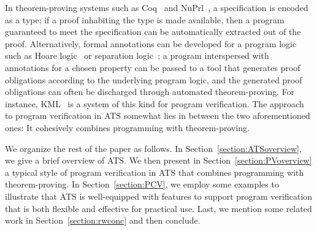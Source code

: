 \documentclass{llncs}
\begin{document}
In theorem-proving systems such as Coq~\cite{Coq} and
NuPrl~\cite{CONSTABLE86}, a specification is encoded as a type; if a proof
inhabiting the type is made available, then a program guaranteed to meet
the specification can be automatically extracted out of the
proof. Alternatively, formal annotations can be developed for a program
logic such as Hoare logic~\cite{HOARE69} or separation
logic~\cite{SeparationLogic}; a program interspersed with annotations for a
chosen property can be passed to a tool that generates proof obligations
according to the underlying program logic, and the generated proof
obligations can often be discharged through automated theorem-proving. For
instance, KML~\cite{Tushkanova2009Specifying} is a system of this kind for
program verification. The approach to program verification in ATS somewhat
lies in between the two aforementioned ones: It cohesively combines
programming with theorem-proving.

We organize the rest of the paper as follows.  In
Section~\ref{section:ATSoverview}, we give a brief overview of ATS.  We
then present in Section~\ref{section:PVoverview} a typical style of program
verification in ATS that combines programming with theorem-proving.  In
Section~\ref{section:PCV}, we employ some examples to illustrate that ATS
is well-equipped with features to support program verification that is both
flexible and effective for practical use.  Last, we mention some related
work in Section~\ref{section:rwconc} and then conclude.

\def\saddr{\it addr}
\def\sbool{\it bool}
\def\sint{\it int}
\def\schar{\it char}
\def\sfloat{\it float}
\def\snat{\it nat}
\def\sprop{\it prop}
\def\stype{\it type}
\def\sview{\it view}
\def\sviewtype{\it viewtype}

\def\sig{{\cal S}}

\def\emptysig{\sig_{\emptyset}}

\def\emptyssub{[]}
\def\ssub{\Theta_S}
\def\emptydsub{[]}
\def\dsub{\Theta_D}

\def\emptysctx{\emptyset}
\def\emptydctx{\emptyset}

\def\basesort{b}

\def\simp{\rightarrow}
\def\Simp{\Rightarrow}

\def\sconst{\mbox{\it sc}}
\def\dconst{\mbox{\it dc}}

\def\app#1#2{{\bf app}(#1,#2)}
\def\lam#1#2{\mbox{\bf lam}\;#1.#2}

\def\Band{\land}
\def\Bimp{\supset}

\def\timp{\rightarrow}
\def\tint{{\bf int}}
\def\tbool{{\bf bool}}
\def\tptr{{\bf ptr}}
\def\tvoid{{\bf void}}
\def\pf{{\it pf\/}}
\end{document}

